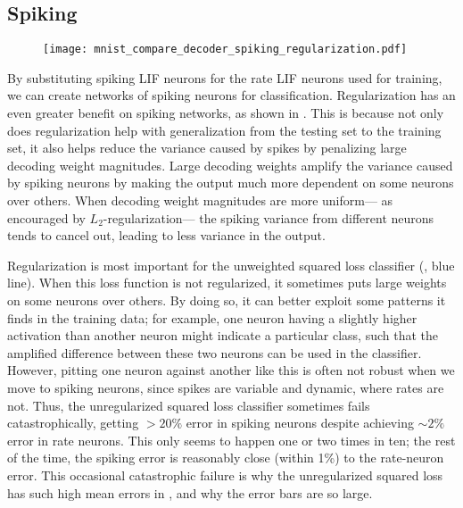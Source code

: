 

\subsection{Spiking}

\begin{figure}
  \centering
  \texttt{[image: mnist\_compare\_decoder\_spiking\_regularization.pdf]}
\end{figure}

By substituting spiking LIF neurons for the rate LIF neurons used for training,
we can create networks of spiking neurons for classification.
Regularization has an even greater benefit on spiking networks,
as shown in .
This is because not only does regularization help with generalization
from the testing set to the training set,
it also helps reduce the variance caused by spikes
by penalizing large decoding weight magnitudes.
Large decoding weights amplify the variance caused by spiking neurons
by making the output much more dependent on some neurons over others.
When decoding weight magnitudes are more uniform---%
as encouraged by $L_2$-regularization---%
the spiking variance from different neurons tends to cancel out,
leading to less variance in the output.

Regularization is most important for the unweighted squared loss classifier
(, blue line).
When this loss function is not regularized,
it sometimes puts large weights on some neurons over others.
By doing so, it can better exploit some patterns it finds in the training data;
for example, one neuron having a slightly higher activation than another neuron
might indicate a particular class,
such that the amplified difference between these two neurons
can be used in the classifier.
However, pitting one neuron against another like this
is often not robust when we move to spiking neurons,
since spikes are variable and dynamic, where rates are not.
Thus, the unregularized squared loss classifier sometimes fails catastrophically,
getting $> 20\%$ error in spiking neurons
despite achieving $\sim 2\%$ error in rate neurons.
This only seems to happen one or two times in ten;
the rest of the time, the spiking error is reasonably close (within 1\%)
to the rate-neuron error.
This occasional catastrophic failure is why the unregularized squared loss
has such high mean errors in ,
and why the error bars are so large.


